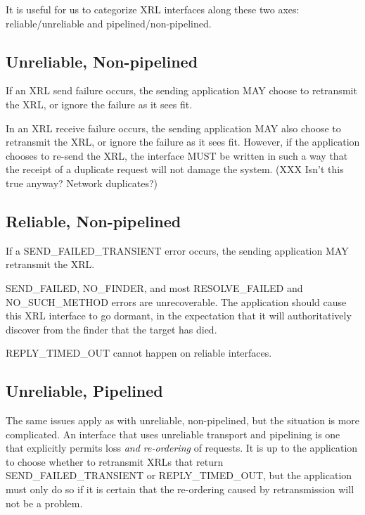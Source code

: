 \documentclass[11pt]{article}
\begin{document}
It is useful for us to categorize XRL interfaces along these two axes:
reliable/unreliable and pipelined/non-pipelined. 

\subsection*{Unreliable, Non-pipelined}

If an XRL send failure occurs, the sending application MAY choose to
retransmit the XRL, or ignore the failure as it sees fit.  

In an XRL receive failure occurs, the sending application MAY also choose
to retransmit the XRL, or ignore the failure as it sees fit. However, if
the application chooses to re-send the XRL, the interface MUST be written
in such a way that the receipt of a duplicate request will not damage the
system. (XXX Isn't this true anyway? Network duplicates?)

\subsection*{Reliable, Non-pipelined}

If a SEND\_FAILED\_TRANSIENT error occurs, the sending application MAY
retransmit the XRL.

SEND\_FAILED, NO\_FINDER, and most RESOLVE\_FAILED and
NO\_SUCH\_METHOD errors are unrecoverable.  The application should
cause this XRL interface to go dormant, in the expectation that it
will authoritatively discover from the finder that the target has
died.

REPLY\_TIMED\_OUT cannot happen on reliable interfaces.

\subsection*{Unreliable, Pipelined}

The same issues apply as with unreliable, non-pipelined, but the
situation is more complicated.  An interface that uses unreliable
transport and pipelining is one that explicitly permits loss \emph{and
re-ordering} of requests.  It is up to the application to choose
whether to retransmit XRLs that return SEND\_FAILED\_TRANSIENT or
REPLY\_TIMED\_OUT, but the application must only do so if it is
certain that the re-ordering caused by retransmission will not be a
problem.
\end{document}
